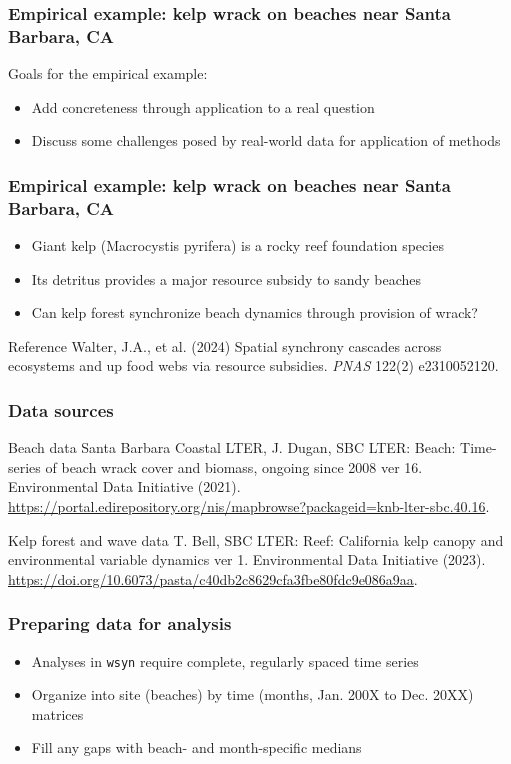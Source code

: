 \documentclass{beamer}
\begin{document}
\begin{frame}
\frametitle{Empirical example: kelp wrack on beaches near Santa Barbara, CA}
Goals for the empirical example:
\begin{itemize}
\item Add concreteness through application to a real question
\item Discuss some challenges posed by real-world data for application of methods
\end{itemize}
\end{frame}

\begin{frame}
\frametitle{Empirical example: kelp wrack on beaches near Santa Barbara, CA}
\begin{itemize}
\item Giant kelp (Macrocystis pyrifera) is a rocky reef foundation species
\item Its detritus provides a major resource subsidy to sandy beaches
\item Can kelp forest synchronize beach dynamics through provision of wrack?
\end{itemize}
\begin{block}{Reference}
Walter, J.A., et al. (2024) Spatial synchrony cascades across ecosystems and up food webs via resource subsidies. \textit{PNAS} 122(2) e2310052120.
\end{block}
\end{frame}

\begin{frame}
\frametitle{Data sources}
\begin{block}{Beach data}
Santa Barbara Coastal LTER, J. Dugan, SBC LTER: Beach: Time-series of beach wrack cover and biomass, ongoing since 2008 ver 16. Environmental Data Initiative (2021). \url{https://portal.edirepository.org/nis/mapbrowse?packageid=knb-lter-sbc.40.16}.
\end{block}
\begin{block}{Kelp forest and wave data}
T. Bell, SBC LTER: Reef: California kelp canopy and environmental variable dynamics ver 1.
Environmental Data Initiative (2023). \url{https://doi.org/10.6073/pasta/c40db2c8629cfa3fbe80fdc9e086a9aa}.
\end{block}
\end{frame}

\begin{frame}
\frametitle{Preparing data for analysis}
\begin{itemize}
\item Analyses in \texttt{wsyn} require complete, regularly spaced time series
\item Organize into site (beaches) by time (months, Jan. 200X to Dec. 20XX) matrices
\item Fill any gaps with beach- and month-specific medians
\end{itemize}
\end{frame}
\end{document}
